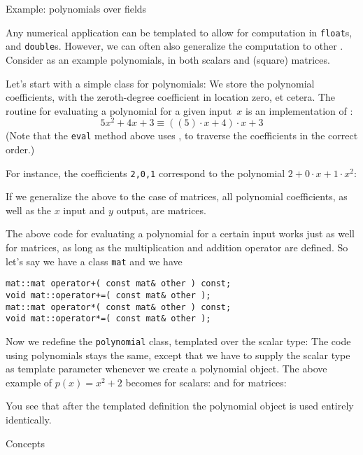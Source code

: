  {Example: polynomials over fields}
\label{sec:poly-template}

Any numerical application can be templated to
allow for computation in
 \lstinline{float}s,
and
 \lstinline{double}s.
However, we can often also generalize the computation
to other .
Consider as an example polynomials,
in both scalars and (square) matrices.

Let's start with a simple class for polynomials:
%
%
We store the polynomial coefficients, with the
zeroth-degree coefficient in location zero, et cetera.
The routine for evaluating a polynomial for a given input~$x$
is an implementation of :
\[ 5 x^2 +4x +3 \equiv ( ( 5 ) \cdot x + 4 ) \cdot x + 3 \]
(Note that the \lstinline{eval} method above
uses ,  to traverse
the coefficients in the correct order.)

For instance, the coefficients \lstinline{2,0,1} correspond
to the polynomial $2+0\cdot x+1\cdot x^2$:
%

If we generalize the above to the case of matrices,
all polynomial coefficients, as well as the $x$ input and $y$ output,
are matrices.

The above code for evaluating a polynomial for a certain input
works just as well for matrices, as long as the multiplication and
addition operator are defined.
So let's say we have a class \lstinline{mat} and we have
\begin{lstlisting}
mat::mat operator+( const mat& other ) const;
void mat::operator+=( const mat& other );
mat::mat operator*( const mat& other ) const;
void mat::operator*=( const mat& other );
\end{lstlisting}

Now we redefine the \lstinline{polynomial} class,
templated over the scalar type:
%
%
The code using polynomials stays the same, except that we
have to supply the scalar type as template parameter
whenever we create a polynomial object.
The above example of $p(x)=x^2+2$ becomes
for scalars:
%
%
and for matrices:
%

You see that after the templated definition
the polynomial object is used entirely identically.

 {Concepts}
\label{sec:cpp-concepts}

